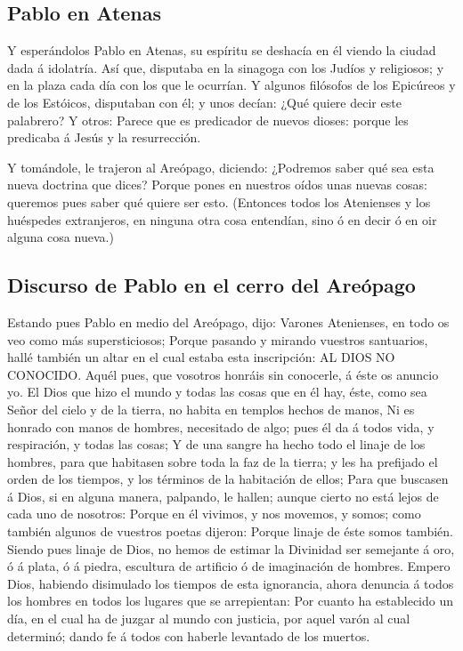 \hypertarget{pablo-en-atenas}{%
\subsection{Pablo en Atenas}\label{pablo-en-atenas}}

 Y esperándolos Pablo en Atenas, su espíritu se deshacía en
él viendo la ciudad dada á idolatría.  Así que, disputaba
en la sinagoga con los Judíos y religiosos; y en la plaza cada día con
los que le ocurrían.  Y algunos filósofos de los Epicúreos
y de los Estóicos, disputaban con él; y unos decían: ¿Qué quiere decir
este palabrero? Y otros: Parece que es predicador de nuevos dioses:
porque les predicaba á Jesús y la resurrección.

 Y tomándole, le trajeron al Areópago, diciendo: ¿Podremos
saber qué sea esta nueva doctrina que dices?  Porque pones
en nuestros oídos unas nuevas cosas: queremos pues saber qué quiere ser
esto.  (Entonces todos los Atenienses y los huéspedes
extranjeros, en ninguna otra cosa entendían, sino ó en decir ó en oir
alguna cosa nueva.)

\hypertarget{discurso-de-pablo-en-el-cerro-del-areuxf3pago}{%
\subsection{Discurso de Pablo en el cerro del
Areópago}\label{discurso-de-pablo-en-el-cerro-del-areuxf3pago}}

 Estando pues Pablo en medio del Areópago, dijo: Varones
Atenienses, en todo os veo como más supersticiosos;  Porque
pasando y mirando vuestros santuarios, hallé también un altar en el cual
estaba esta inscripción: AL DIOS NO CONOCIDO. Aquél pues, que vosotros
honráis sin conocerle, á éste os anuncio yo.  El Dios que
hizo el mundo y todas las cosas que en él hay, éste, como sea Señor del
cielo y de la tierra, no habita en templos hechos de manos,
 Ni es honrado con manos de hombres, necesitado de algo;
pues él da á todos vida, y respiración, y todas las cosas; 
Y de una sangre ha hecho todo el linaje de los hombres, para que
habitasen sobre toda la faz de la tierra; y les ha prefijado el orden de
los tiempos, y los términos de la habitación de ellos; 
Para que buscasen á Dios, si en alguna manera, palpando, le hallen;
aunque cierto no está lejos de cada uno de nosotros: 
Porque en él vivimos, y nos movemos, y somos; como también algunos de
vuestros poetas dijeron: Porque linaje de éste somos también.
 Siendo pues linaje de Dios, no hemos de estimar la
Divinidad ser semejante á oro, ó á plata, ó á piedra, escultura de
artificio ó de imaginación de hombres.  Empero Dios,
habiendo disimulado los tiempos de esta ignorancia, ahora denuncia á
todos los hombres en todos los lugares que se arrepientan: 
Por cuanto ha establecido un día, en el cual ha de juzgar al mundo con
justicia, por aquel varón al cual determinó; dando fe á todos con
haberle levantado de los muertos.

